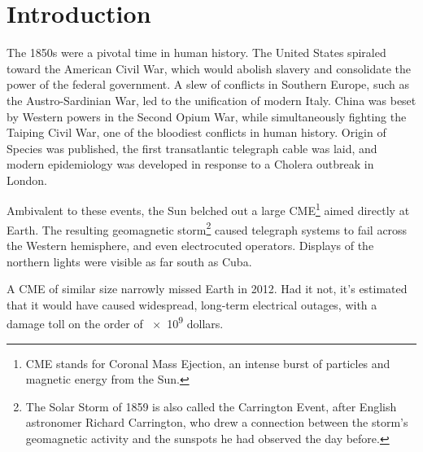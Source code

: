 
\chapter{Introduction}
  \label{ch_intro}

The 1850s were a pivotal time in human history. The United States spiraled toward the American Civil War, which would abolish slavery and consolidate the power of the federal government. A slew of conflicts in Southern Europe, such as the Austro-Sardinian War, led to the unification of modern Italy. China was beset by Western powers in the Second Opium War, while simultaneously fighting the Taiping Civil War, one of the bloodiest conflicts in human history. Origin of Species was published, the first transatlantic telegraph cable was laid, and modern epidemiology was developed in response to a Cholera outbreak in London. 

Ambivalent to these events, the Sun belched out a large CME\footnote{CME stands for Coronal Mass Ejection, an intense burst of particles and magnetic energy from the Sun.} aimed directly at Earth. The resulting geomagnetic storm\footnote{The Solar Storm of 1859 is also called the Carrington Event, after English astronomer Richard Carrington, who drew a connection between the storm's geomagnetic activity and the sunspots he had observed the day before.} caused telegraph systems to fail across the Western hemisphere\cite{green_2006}, and even electrocuted operators. Displays of the northern lights were visible as far south as Cuba. 

A CME of similar size narrowly missed Earth in 2012\cite{nasa_2012}. Had it not, it's estimated\cite{lloyds_2013} that it would have caused widespread, long-term electrical outages, with a damage toll on the order of \num{e9} dollars. 


